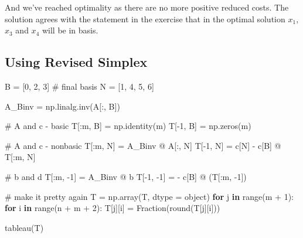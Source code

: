 \documentclass[
  letterpaper,
  DIV=11,
  numbers=noendperiod]{scrartcl}
\newenvironment{Shaded}{\begin{snugshade}}{\end{snugshade}}
\newcommand{\BuiltInTok}[1]{\textcolor[rgb]{0.00,0.23,0.31}{#1}}
\newcommand{\CommentTok}[1]{\textcolor[rgb]{0.37,0.37,0.37}{#1}}
\newcommand{\ControlFlowTok}[1]{\textcolor[rgb]{0.00,0.23,0.31}{\textbf{#1}}}
\newcommand{\DecValTok}[1]{\textcolor[rgb]{0.68,0.00,0.00}{#1}}
\newcommand{\KeywordTok}[1]{\textcolor[rgb]{0.00,0.23,0.31}{\textbf{#1}}}
\newcommand{\NormalTok}[1]{\textcolor[rgb]{0.00,0.23,0.31}{#1}}
\newcommand{\OperatorTok}[1]{\textcolor[rgb]{0.37,0.37,0.37}{#1}}
\begin{document}
And we've reached optimality as there are no more positive reduced
costs. The solution agrees with the statement in the exercise that in
the optimal solution \(x_1\), \(x_3\) and \(x_4\) will be in basis.

\subsection{Using Revised Simplex}\label{using-revised-simplex}

\begin{Shaded}
\begin{Highlighting}[]
\NormalTok{B }\OperatorTok{=}\NormalTok{ [}\DecValTok{0}\NormalTok{, }\DecValTok{2}\NormalTok{, }\DecValTok{3}\NormalTok{] }\CommentTok{\# final basis}
\NormalTok{N }\OperatorTok{=}\NormalTok{ [}\DecValTok{1}\NormalTok{, }\DecValTok{4}\NormalTok{, }\DecValTok{5}\NormalTok{, }\DecValTok{6}\NormalTok{]}

\NormalTok{A\_Binv }\OperatorTok{=}\NormalTok{ np.linalg.inv(A[:, B])}

\CommentTok{\# A and c {-} basic}
\NormalTok{T[:m, B] }\OperatorTok{=}\NormalTok{ np.identity(m)}
\NormalTok{T[}\OperatorTok{{-}}\DecValTok{1}\NormalTok{, B] }\OperatorTok{=}\NormalTok{ np.zeros(m)}

\CommentTok{\# A and c {-} nonbasic}
\NormalTok{T[:m, N] }\OperatorTok{=}\NormalTok{ A\_Binv }\OperatorTok{@}\NormalTok{ A[:, N]}
\NormalTok{T[}\OperatorTok{{-}}\DecValTok{1}\NormalTok{, N] }\OperatorTok{=}\NormalTok{ c[N] }\OperatorTok{{-}}\NormalTok{ c[B] }\OperatorTok{@}\NormalTok{ T[:m, N]}

\CommentTok{\# b and d}
\NormalTok{T[:m, }\OperatorTok{{-}}\DecValTok{1}\NormalTok{] }\OperatorTok{=}\NormalTok{ A\_Binv }\OperatorTok{@}\NormalTok{ b}
\NormalTok{T[}\OperatorTok{{-}}\DecValTok{1}\NormalTok{, }\OperatorTok{{-}}\DecValTok{1}\NormalTok{] }\OperatorTok{=} \OperatorTok{{-}}\NormalTok{ c[B] }\OperatorTok{@}\NormalTok{ (T[:m, }\OperatorTok{{-}}\DecValTok{1}\NormalTok{])}

\CommentTok{\# make it pretty again}
\NormalTok{T }\OperatorTok{=}\NormalTok{ np.array(T, dtype }\OperatorTok{=} \BuiltInTok{object}\NormalTok{)}
\ControlFlowTok{for}\NormalTok{ j }\KeywordTok{in} \BuiltInTok{range}\NormalTok{(m }\OperatorTok{+} \DecValTok{1}\NormalTok{):}
    \ControlFlowTok{for}\NormalTok{ i }\KeywordTok{in} \BuiltInTok{range}\NormalTok{(n }\OperatorTok{+}\NormalTok{ m }\OperatorTok{+} \DecValTok{2}\NormalTok{):}
\NormalTok{        T[j][i] }\OperatorTok{=}\NormalTok{ Fraction(}\BuiltInTok{round}\NormalTok{(T[j][i]))}

\NormalTok{tableau(T)}
\end{Highlighting}
\end{Shaded}
\end{document}
